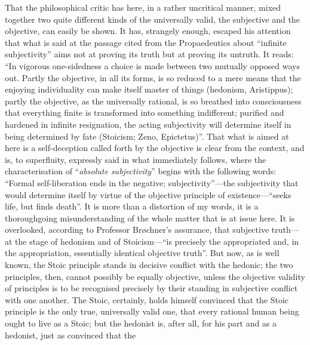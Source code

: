 \documentclass[12pt]{book}
\newcommand{\opage}[1]{\marginnote{\footnotesize\textit{[#1]}}}
\begin{document}
That the philosophical critic has here, in a rather uncritical manner,
mixed together two quite different kinds of the universally valid, the
subjective and the objective, can easily be shown. It has, strangely enough,
escaped his attention that what is said at the passage cited from the
Propaedeutics about ``infinite subjectivity'' aims not at proving its truth
but at proving its untruth. It reads: ``In vigorous one-sidedness a choice
is made between two mutually opposed ways out. Partly the objective, in all
its forms, is so reduced to a mere means that the enjoying individuality can
make itself master of things (hedonism, Aristippus); partly the objective, as
the universally rational, is so breathed into consciousness that everything
finite is transformed into something indifferent; purified and hardened in
infinite resignation, the acting subjectivity will determine itself in being
determined by fate (Stoicism; Zeno, Epictetus)''. That what is aimed at here
is a self-deception called forth by the objective is clear from the context,
and is, to superfluity, expressly said in what immediately follows, where the
characterisation of ``\emph{absolute subjectivity}'' begins with the
following words: ``Formal self-liberation ends in the negative;
subjectivity''---the subjectivity that would determine itself by virtue of
the objective principle of existence---``seeks life, but finds death''. It
is more than a distortion of my words, it is a thoroughgoing
misunderstanding of the whole matter that is
\opage{13}\setcounter{footnote}{0}%
at issue here. It is overlooked, according to Professor Brøchner's
assurance, that subjective truth---at the stage of hedonism and of
Stoicism---``is precisely the appropriated and, in the appropriation,
essentially identical objective truth''. But now, as is well known, the
Stoic principle stands in decisive conflict with the hedonic; the two
principles, then, cannot possibly be equally objective, unless the objective
validity of principles is to be recognised precisely by their standing in
subjective conflict with one another. The Stoic, certainly, holds himself
convinced that the Stoic principle is the only true, universally valid one,
that every rational human being ought to live as a Stoic; but the hedonist
is, after all, for his part and as a hedonist, just as convinced that the
\end{document}
